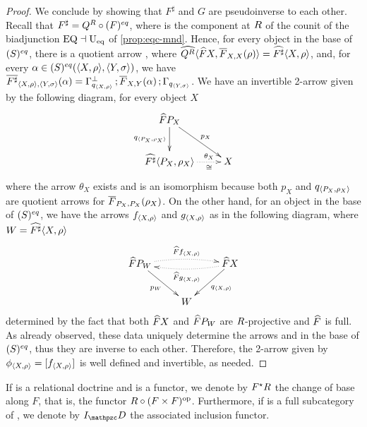 \begin{proof}
We conclude by showing that $F^\sharp$ and $G$ are pseudoinverse to each other. 
Recall that $F^\sharp = Q^R\circ(F)^{eq}$, where 
 is the component at $R$ of the counit of the biadjunction $\mathrm{EQ}\dashv\mathrm{U_{eq}}$ of \cref{prop:eqc-mnd}. 
Hence, for every object  in the base of $(S)^{eq}$, there is a quotient arrow , where $\widehat{Q^R}{\langle \widehat{F}X,\overline{F}_{X,X}(\rho) \rangle } = \widehat{F^\sharp}{\langle X,\rho \rangle }$, and, 
for every $\alpha \in (S)^{eq}({\langle X,\rho \rangle },{\langle Y,\sigma \rangle })$, we have 
$\overline{F^\sharp}_{{\langle X,\rho \rangle },{\langle Y,\sigma \rangle }}(\alpha) = \Gamma_{q_{{\langle X,\rho \rangle }}}^{\bot}\mathop{\mathbf{;}}\overline{F}_{X,Y}(\alpha)\mathop{\mathbf{;}}\Gamma_{q_{{\langle Y,\sigma \rangle }}}$. 
% 
We have an invertible 2-arrow  given by the following diagram, for every object $X$ 
\[\xymatrix{
  \fn{F}P_X 
  \ar[d]_-{q_\ple{P_X,\eqrelr_X}}
  \ar[rd]^-{p_X} 
\\
  \fn{F^\sharp}\ple{P_X,\eqrelr_X} 
  \ar@{..>}[r]^-{\theta_X}_-{\cong} 
& X 
}\]
where the arrow $\theta_X$ exists and is an isomorphism because both $p_X$ and $q_{{\langle P_X,\rho_X \rangle }}$ are quotient arrows for $\overline{F}_{P_X,P_X}(\rho_X)$. 
% 
On the other hand, 
for an object  in the base of $(S)^{eq}$, we have the arrows $f_{{\langle X,\rho \rangle }}$ and $g_{{\langle X,\rho \rangle }}$ as in the following diagram, where $W = \widehat{F^\sharp}{\langle X,\rho \rangle }$ 
\[\xymatrix{
  \fn{F}P_W 
  \ar[rd]_-{p_W}
  \ar@{..>}@/^5pt/[rr]^-{\fn{F}f_\ple{X,\eqrelr}} 
& 
& \fn{F}X 
  \ar[ld]^-{q_\ple{X,\eqrelr}} 
  \ar@{..>}@/^5pt/[ll]^-{\fn{F}g_\ple{X,\eqrelr}} 
\\
& W 
}\]
determined by the fact that both $\widehat{F}X$ and $\widehat{F}P_W$ are $R$-projective and $\widehat{F}$ is full. 
As already observed, these data uniquely determine the arrows 
 and  in the base of $(S)^{eq}$, thus they are inverse to each other. 
Therefore, the 2-arrow  given by $\phi_{{\langle X,\rho \rangle }} = [f_{{\langle X,\rho \rangle }}]_{}$ is well defined and invertible, as needed.
\end{proof}

If \fun\RDoc{\bop\CC}{\Pos} is a relational doctrine and  is a functor, 
we denote by $F^\star R$ the change of base along $F$, that is, the functor $R\circ(F\times F)^{\mbox{\normalfont\scriptsize op}}$. 
Furthermore, if \D is a full subcategory of \CC, we denote by $I_\D$ the associated inclusion functor. 

